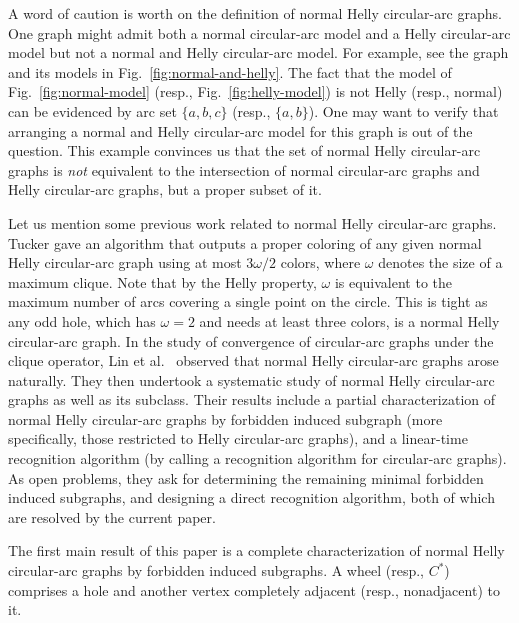 \documentclass[10pt]{article}
\newcommand{\nhcag}{normal Helly circular-arc graph}
\begin{document}
A word of caution is worth on the definition of \nhcag s.  One graph
might admit both a normal circular-arc model and a Helly circular-arc
model but not a normal and Helly circular-arc model.  For example, see
the graph and its models in Fig.~\ref{fig:normal-and-helly}.  The fact
that the model of Fig.~\ref{fig:normal-model} (resp.,
Fig.~\ref{fig:helly-model}) is not Helly (resp., normal) can be
evidenced by arc set $\{a,b,c\}$ (resp., $\{a,b\}$).  One may want to
verify that arranging a normal and Helly circular-arc model for this
graph is out of the question.  This example convinces us that the set
of \nhcag s is {\em not} equivalent to the intersection of normal
circular-arc graphs and Helly circular-arc graphs, but a proper subset
of it.

Let us mention some previous work related to normal Helly circular-arc
graphs.  Tucker \cite{tucker-75-coloring-cag} gave an algorithm that
outputs a proper coloring of any given normal Helly circular-arc graph
using at most $3\omega/2$ colors, where $\omega$ denotes the size of a
maximum clique.  Note that by the Helly property, $\omega$ is
equivalent to the maximum number of arcs covering a single point on
the circle.  This is tight as any odd hole, which has $\omega = 2$ and
needs at least three colors, is a \nhcag.  In the study of convergence
of circular-arc graphs under the clique operator, Lin et
al.~\cite{lin--10-clique-operator-cag} observed that normal Helly
circular-arc graphs arose naturally.  They then
\cite{lin-13-nhcag-and-subclasses} undertook a systematic study of
normal Helly circular-arc graphs as well as its subclass.  Their
results include a partial characterization of \nhcag s by forbidden
induced subgraph (more specifically, those restricted to Helly
circular-arc graphs), and a linear-time recognition algorithm (by
calling a recognition algorithm for circular-arc graphs).  As open
problems, they ask for determining the remaining minimal forbidden
induced subgraphs, and designing a direct recognition algorithm, both
of which are resolved by the current paper.

The first main result of this paper is a complete characterization of
\nhcag s by forbidden induced subgraphs.  A wheel (resp., $C^*$)
comprises a hole and another vertex completely adjacent (resp.,
nonadjacent) to it.
\end{document}
